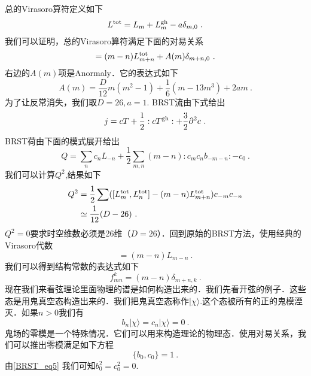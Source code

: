 总的Virasoro算符定义如下
\begin{equation}
L^{\rm tot} = L_m + L^{\rm gh}_m - a \delta_{m,0}~.
\end{equation}
我们可以证明，总的Virasoro算符满足下面的对易关系
\begin{equation}
[L^{\rm tot}_m,L^{\rm tot}_n] = (m-n) L^{\rm tot}_{m+n} + A(m) \delta_{m+n,0}~. 
\end{equation}
右边的$A(m)$项是Anormaly．它的表达式如下
\begin{equation}
A(m) = \frac{D}{12} m (m^2-1) + \frac{1}{6} (m-13 m^3) + 2 a m~. 
\end{equation}
为了让反常消失，我们取$D=26,a=1$. BRST流由下式给出
\begin{equation}
j = c T+ \frac{1}{2} : c T^{\rm gh} : + \frac{3}{2} \partial^2 c~.
\end{equation}
BRST荷由下面的模式展开给出
\begin{equation}
Q = \sum_n c_n L_{-n} + \frac{1}{2} \sum_{m,n} (m-n) :c_m c_n b_{-m-n}: -c_0~.
\end{equation}
我们可以计算$Q^2$,结果如下
\begin{equation}
\begin{aligned}
Q^2&  = \frac{1}{2} \sum ( [L^{\rm tot}_m,L^{\rm tot}_n] - (m-n) L^{\rm tot}_{m+n} ) c_{-m} c_{-n} \\
& \simeq \frac{1}{12} (D-26)~.
\end{aligned}
\end{equation}
$Q^2=0$要求时空维数必须是26维（$D=26$）．回到原始的BRST方法，使用经典的Virasoro代数
\begin{equation}
[L_m,L_n]=(m-n)L_{m-n}~.
\end{equation}
我们可以得到结构常数的表达式如下
\begin{equation}
f^k_{mn} = (m-n) \delta_{m+n,k}~.
\end{equation}
现在我们来看弦理论里面物理的谱是如何构造出来的．我们先看开弦的例子．这些态是用鬼真空态构造出来的．我们把鬼真空态称作$|\chi\rangle$.这个态被所有的正的鬼模湮灭．如果$n>0$我们有
\begin{equation}
b_n|\chi\rangle = c_n|\chi\rangle = 0~.
\end{equation}
鬼场的零模是一个特殊情况．它们可以用来构造理论的物理态．使用对易关系，我们可以推出零模满足如下方程
\begin{equation}
\{b_0,c_0\} = 1~.
\end{equation}
由\autoref{BRST_eq5} 我们可知$b_0^2=c_0^2=0$.





















